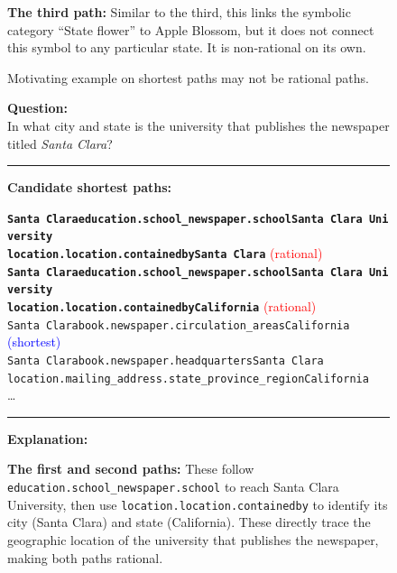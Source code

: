 \begin{figure}[t]
\begin{tcolorbox}[colback=gray!5!white,
                  colframe=gray!75!black,
                  title=WebQTrn-2349\_e831da3802943dad506eb1e3fb611847]
{\textbf{The third path:} Similar to the third, this links the symbolic category “State flower” to Apple Blossom, but it does not connect this symbol to any particular state. It is non-rational on its own.
\par}

\end{tcolorbox}
\caption{Motivating example on shortest paths may not be rational paths.}
\label{fig:type2_no3}
\end{figure}


\begin{figure}[t]
\begin{tcolorbox}[colback=gray!5!white,
                  colframe=gray!75!black,
                  title=WebQTrn-88\_54f1262a1dbcb7b82f5b8ebd614401b9]
\scriptsize

\textbf{Question:}\\
In what city and state is the university that publishes the newspaper titled \emph{Santa Clara}?

\rule{\linewidth}{0.4pt}

\textbf{Candidate shortest paths:}\\[2pt]
{\raggedright
\texttt{\textbf{Santa Clara\patharrow education.school\_newspaper.school\patharrow Santa Clara University\patharrow \\ location.location.containedby\patharrow Santa Clara}}\hfill
\textcolor{red}{(rational)}\\[6pt]

\texttt{\textbf{Santa Clara\patharrow education.school\_newspaper.school\patharrow Santa Clara University\patharrow \\ location.location.containedby\patharrow California}}\hfill
\textcolor{red}{(rational)}\\[6pt]

\texttt{Santa Clara\patharrow book.newspaper.circulation\_areas\patharrow California}\hfill
\textcolor{blue}{(shortest)}\\[6pt]

\texttt{Santa Clara\patharrow book.newspaper.headquarters\patharrow Santa Clara\patharrow \\ location.mailing\_address.state\_province\_region\patharrow California}\\[6pt]
\ldots
\par}

\rule{\linewidth}{0.4pt}

\textbf{Explanation:}\\[2pt]
{\raggedright
\textbf{The first and second paths:} These follow \texttt{education.school\_newspaper.school} to reach Santa Clara University, then use \texttt{location.location.containedby} to identify its city (Santa Clara) and state (California). These directly trace the geographic location of the university that publishes the newspaper, making both paths rational.\par\vspace{6pt}

}
\end{tcolorbox}
\end{figure}
